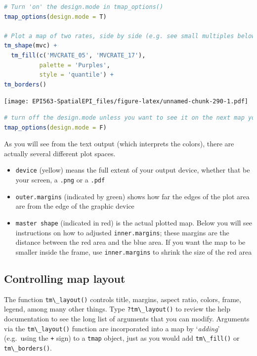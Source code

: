 \documentclass[
]{book}
\newcommand{\passthrough}[1]{#1}
\providecommand{\tightlist}{%
  \setlength{\itemsep}{0pt}\setlength{\parskip}{0pt}}
\begin{document}
\begin{lstlisting}[language=R]
# Turn 'on' the design.mode in tmap_options()
tmap_options(design.mode = T)

# Plot a map of two rates, side by side (e.g. see small multiples below)
tm_shape(mvc) + 
  tm_fill(c('MVCRATE_05', 'MVCRATE_17'),
          palette = 'Purples',
          style = 'quantile') +
tm_borders()
\end{lstlisting}

\texttt{[image: EPI563-SpatialEPI\_files/figure-latex/unnamed-chunk-290-1.pdf]}

\begin{lstlisting}[language=R]
# turn off the design.mode unless you want to see it on the next map you plot
tmap_options(design.mode = F)
\end{lstlisting}

As you will see from the text output (which interprets the colors), there are actually several different plot spaces.

\begin{itemize}
\tightlist
\item
  \passthrough{\lstinline!device!} (yellow) means the full extent of your output device, whether that be your screen, a \passthrough{\lstinline!.png!} or a \passthrough{\lstinline!.pdf!}
\item
  \passthrough{\lstinline!outer.margins!} (indicated by green) shows how far the edges of the plot area are from the edge of the graphic device
\item
  \passthrough{\lstinline!master shape!} (indicated in red) is the actual plotted map. Below you will see instructions on how to adjusted \passthrough{\lstinline!inner.margins!}; these margins are the distance between the red area and the blue area. If you want the map to be smaller inside the frame, use \passthrough{\lstinline!inner.margins!} to shrink the size of the red area
\end{itemize}

\hypertarget{controlling-map-layout}{%
\subsection{Controlling map layout}\label{controlling-map-layout}}

The function \passthrough{\lstinline!tm\_layout()!} controls title, margins, aspect ratio, colors, frame, legend, among many other things. Type \passthrough{\lstinline!?tm\_layout()!} to review the help documentation to see the long list of arguments that you can modify. Arguments via the \passthrough{\lstinline!tm\_layout()!} function are incorporated into a map by `\emph{adding}' (e.g.~using the \passthrough{\lstinline!+!} sign) to a \passthrough{\lstinline!tmap!} object, just as you would add \passthrough{\lstinline!tm\_fill()!} or \passthrough{\lstinline!tm\_borders()!}.
\end{document}
